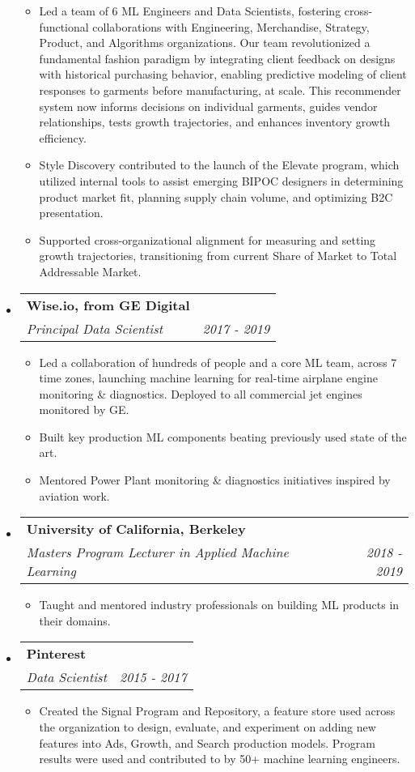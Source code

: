 \documentclass[letterpaper,11pt]{article}
\makeatletter
\newcommand{\resitem}[1]{\item #1 \vspace{-2pt}}
\newcommand{\ressubheading}[4]{

\begin{tabular*}{6.5in}{l@{\cftdotfill{\cftsecdotsep}\extracolsep{\fill}}r}

		\textbf{#1} & #2 \\

		\textit{#3} & \textit{#4} \\

\end{tabular*}\vspace{-6pt}}
\makeatother
\begin{document}
\begin{itemize}
	\begin{itemize}
	    \resitem{Led a team of 6 ML Engineers and Data Scientists, fostering cross-functional collaborations with Engineering, Merchandise, Strategy, Product, and Algorithms organizations. Our team revolutionized a fundamental fashion paradigm by integrating client feedback on designs with historical purchasing behavior, enabling predictive modeling of client responses to garments before manufacturing, at scale. This recommender system now informs decisions on individual garments, guides vendor relationships, tests growth trajectories, and enhances inventory growth efficiency.}
	    \resitem{Style Discovery contributed to the launch of the Elevate program, which utilized internal tools to assist emerging BIPOC designers in determining product market fit, planning supply chain volume, and optimizing B2C presentation.}
	    \resitem{Supported cross-organizational alignment for measuring and setting growth trajectories, transitioning from current Share of Market to Total Addressable Market.}
	\end{itemize}
	
\item[] 
	\ressubheading{\color{gecolor}Wise.io, from GE Digital}{}{Principal Data Scientist}{2017 - 2019}

	\begin{itemize}
	    \resitem{Led a collaboration of hundreds of people and a core ML team, across 7 time zones, launching machine learning for real-time airplane engine monitoring \& diagnostics. Deployed to all commercial jet engines monitored by GE.}
	    \resitem{Built key production ML components beating previously used state of the art.}
	    \resitem{Mentored Power Plant monitoring \& diagnostics initiatives inspired by aviation work.}
	\end{itemize}

\item[]
	\ressubheading{\color{deepblue}University of California, Berkeley}{}{Masters Program Lecturer in Applied Machine Learning}{2018 - 2019}
	\begin{itemize}
	    \resitem{Taught and mentored industry professionals on building ML products in their domains.}
	\end{itemize}

\item[] 
	\ressubheading{\color{pinterestcolor}Pinterest}{}{Data Scientist}{2015 - 2017}

	\begin{itemize}
	    \resitem{Created the Signal Program and Repository, a feature store used across the organization to design, evaluate, and experiment on adding new features into Ads, Growth, and Search production models. Program results were used and contributed to by 50+ machine learning engineers.}
	\end{itemize}


\end{itemize}
\end{document}
